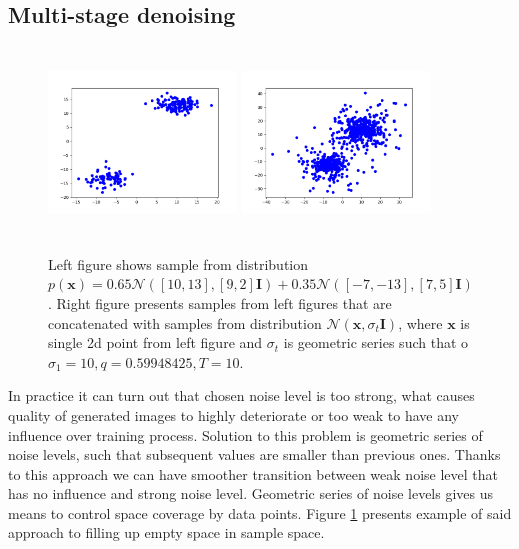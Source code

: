 \documentclass[10pt]{article}
\begin{document}
\subsection{Multi-stage  denoising}
\begin{figure}
    \centering
    \includegraphics[width = 5cm, height = 5cm]{gauss_przed_szumem.png}
     \includegraphics[width = 5cm, height = 5cm]{gauss_po_szumie.png}
    \caption[Filling gaps in dataset with noise.]
    {Left figure shows sample from distribution
    $p(\textbf{x}) = 0.65\mathcal{N}([ 10, 13], [ 9, 2] \mathbf{I} ) + 
    0.35\mathcal{N}([-7, -13], [ 7, 5] \mathbf{I} )$. Right figure presents samples from left figures that are concatenated with samples from distribution  $\mathcal{N}(\textbf{x}, \sigma_t \mathbf{I})$, where  $\textbf{x}$ is single 2d point from left figure and $\sigma_t$ is geometric series such that o $\sigma_1 = 10, q = 0.59948425, T = 10$.}
\label{fig:gauss_comparisson}
\end{figure}
In practice it can turn out that chosen noise level is too strong, what causes quality of generated images to highly deteriorate or too weak to have any influence over training process. Solution to this problem is geometric series of noise levels, such that subsequent values are smaller than previous ones. Thanks to this approach we can have smoother transition between weak noise level that has no influence and strong noise level. Geometric series of noise levels gives us means to control space coverage by data points. Figure \ref{fig:gauss_comparisson} presents example of said approach to filling up empty space in sample space.
\end{document}

